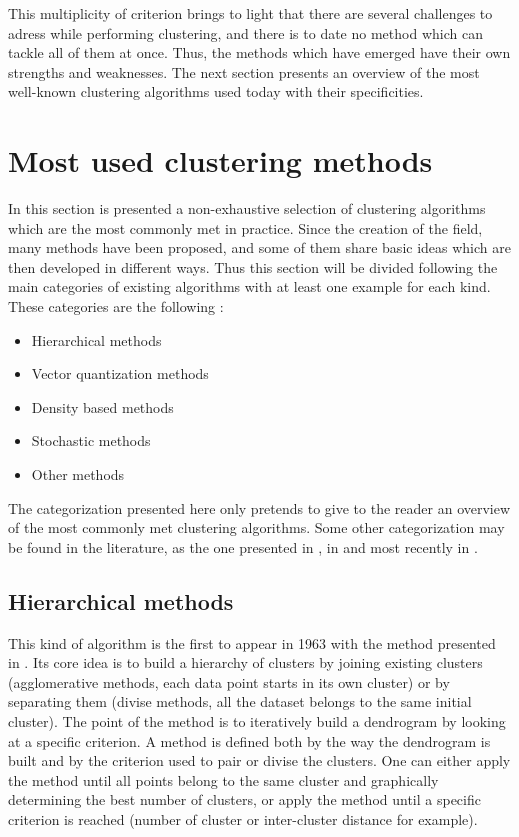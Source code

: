 \documentclass[a4paper]{report}
\begin{document}
    This multiplicity of criterion brings to light that there are several challenges to adress while performing clustering, and there is to date no method which can tackle all of them at once. Thus, the methods which have emerged have their own strengths and weaknesses. The next section presents an overview of the most well-known clustering algorithms used today with their specificities.

    \section{Most used clustering methods}

    In this section is presented a non-exhaustive selection of clustering algorithms which are the most commonly met in practice. Since the creation of the field, many methods have been proposed, and some of them share basic ideas which are then developed in different ways. Thus this section will be divided following the main categories of existing algorithms with at least one example for each kind. These categories are the following :

    \begin{itemize}
        \item Hierarchical methods
        \item Vector quantization methods
        \item Density based methods
        \item Stochastic methods
        \item Other methods 
    \end{itemize}

    The categorization presented here only pretends to give to the reader an overview of the most commonly met clustering algorithms. Some other categorization may be found in the literature, as the one presented in \cite{jain1999data}, in \cite{xu2005survey} and most recently in \cite{fahad2014survey}.

    \subsection{Hierarchical methods}

    This kind of algorithm is the first to appear in 1963 with the method presented in \cite{ward1963hierarchical}. Its core idea is to build a hierarchy of clusters by joining existing clusters (agglomerative methods, each data point starts in its own cluster) or by separating them (divise methods, all the dataset belongs to the same initial cluster). The point of the method is to iteratively build a dendrogram by looking at a specific criterion. A method is defined both by the way the dendrogram is built and by the criterion used to pair or divise the clusters. One can either apply the method until all points belong to the same cluster and graphically determining the best number of clusters, or apply the method until a specific criterion is reached (number of cluster or inter-cluster distance for example).
\end{document}
